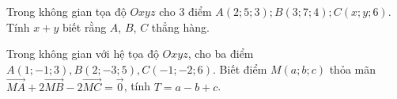 \begin{ex}%
Trong không gian tọa độ $Oxyz$ cho 3 điểm $A\left(2;5;3\right); B\left(3;7;4\right); C\left(x; y; 6\right)$. Tính $x+y$ biết rằng $A$, $B$, $C$ thẳng hàng.
\end{ex}
\begin{ex}%
Trong không gian với hệ tọa độ $Oxyz$, cho ba điểm $A\left(1;-1;3\right), B\left(2;-3;5\right), C\left(-1;-2;6\right)$. Biết điểm $M\left(a;b;c\right)$ thỏa mãn $\overrightarrow{MA}+2\overrightarrow{MB}-2\overrightarrow{MC}=\overrightarrow0$, tính $T=a-b+c$.
\end{ex}

